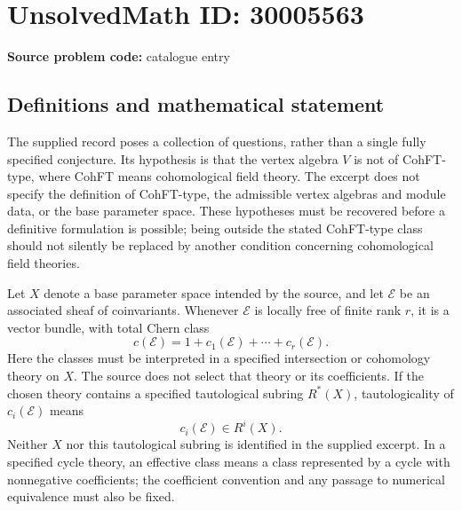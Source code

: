 \documentclass[11pt]{article}
\begin{document}
\section*{UnsolvedMath ID: 30005563}
\textbf{Source problem code:} catalogue entry
\subsection{Definitions and mathematical statement}
The supplied record poses a collection of questions, rather than a single fully specified conjecture. Its hypothesis is that the vertex algebra \(V\) is not of CohFT-type, where CohFT means cohomological field theory. The excerpt does not specify the definition of CohFT-type, the admissible vertex algebras and module data, or the base parameter space. These hypotheses must be recovered before a definitive formulation is possible; being outside the stated CohFT-type class should not silently be replaced by another condition concerning cohomological field theories.

Let \(X\) denote a base parameter space intended by the source, and let \(\mathcal E\) be an associated sheaf of coinvariants. Whenever \(\mathcal E\) is locally free of finite rank \(r\), it is a vector bundle, with total Chern class
\[
c(\mathcal E)=1+c_1(\mathcal E)+\cdots+c_r(\mathcal E).
\]
Here the classes must be interpreted in a specified intersection or cohomology theory on \(X\). The source does not select that theory or its coefficients. If the chosen theory contains a specified tautological subring \(R^*(X)\), tautologicality of \(c_i(\mathcal E)\) means
\[
c_i(\mathcal E)\in R^i(X).
\]
Neither \(X\) nor this tautological subring is identified in the supplied excerpt. In a specified cycle theory, an effective class means a class represented by a cycle with nonnegative coefficients; the coefficient convention and any passage to numerical equivalence must also be fixed.
\end{document}
